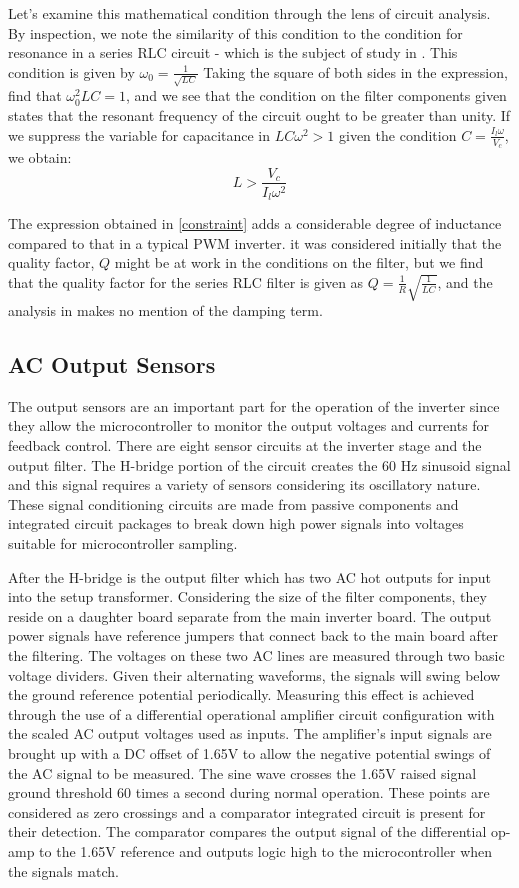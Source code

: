 Let's examine this mathematical condition through the lens of circuit analysis. By inspection, we note the similarity of this condition to the condition for resonance in a series RLC circuit - which is the subject of study in \cite{ricardo}. This condition is given by $\omega_0 = \frac{1}{\sqrt{LC}}$ Taking the square of both sides in the expression, find that $\omega_0^2LC=1$, and we see that the condition on the filter components given states that the resonant frequency of the circuit ought to be greater than unity. If we suppress the variable for capacitance in 
$LC\omega^2>1$ given the condition $C=\frac{I_l\omega}{V_c}$, we obtain:
\begin{equation}
\label{constraint}
L > \frac{V_c}{I_l\omega^2}
\end{equation}

The expression obtained in \ref{constraint} adds a considerable degree of inductance compared to that in a typical PWM inverter. it was considered initially that the quality factor, $Q$ might be at work in the conditions on the filter, but we find that the quality factor for the series RLC filter is given as $Q = \frac{1}{R}\sqrt{\frac{1}{LC}}$, and the analysis in \cite{ricardo} makes no mention of the damping term.

\subsection{AC Output Sensors}
The output sensors are an important part for the operation of the inverter since they allow the microcontroller to monitor the output voltages and currents for feedback control. There are eight sensor circuits at the inverter stage and the output filter. The H-bridge portion of the circuit creates the 60 Hz sinusoid signal and this signal requires a variety of sensors considering its oscillatory nature. These signal conditioning circuits are made from passive components and integrated circuit packages to break down high power signals into voltages suitable for microcontroller sampling. 
	
After the H-bridge is the output filter which has two AC hot outputs for input into the setup transformer. Considering the size of the filter components, they reside on a daughter board separate from the main inverter board. The output power signals have reference jumpers that connect back to the main board after the filtering. The voltages on these two AC lines are measured through two basic voltage dividers. Given their alternating waveforms, the signals will swing below the ground reference potential periodically. Measuring this effect is achieved through the use of a differential operational amplifier circuit configuration with the scaled AC output voltages used as inputs. The amplifier's input signals are brought up with a DC offset of 1.65V to allow the negative potential swings of the AC signal to be measured. The sine wave crosses the 1.65V raised signal ground threshold 60 times a second during normal operation. These points are considered as zero crossings and a comparator integrated circuit is present for their detection. The comparator compares the output signal of the differential op-amp to the 1.65V reference and outputs logic high to the microcontroller when the signals match.

